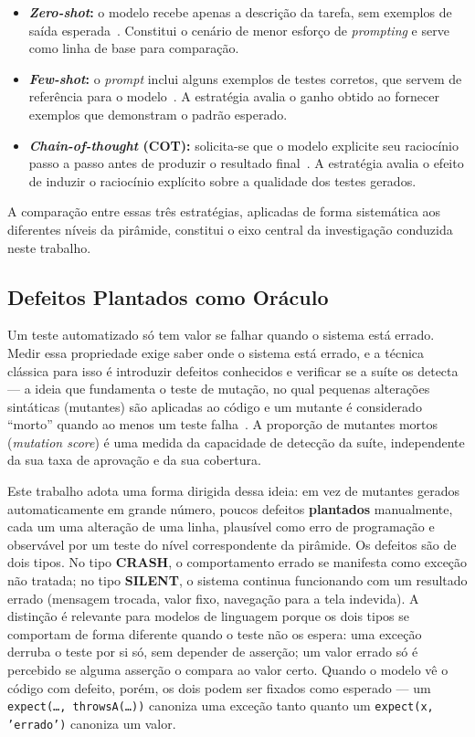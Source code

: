 \documentclass[12pt]{article}
\begin{document}
\begin{itemize}
  \item \textbf{\textit{Zero-shot}:} o modelo recebe apenas a descrição da
  tarefa, sem exemplos de saída esperada~\cite{kojima2022}. Constitui o
  cenário de menor esforço de \textit{prompting} e serve como linha de base para
  comparação.

  \item \textbf{\textit{Few-shot}:} o \textit{prompt} inclui alguns exemplos
  de testes corretos, que servem de referência para o
  modelo~\cite{brown2020}. A estratégia avalia o ganho obtido ao fornecer
  exemplos que demonstram o padrão esperado.

  \item \textbf{\textit{Chain-of-thought} (COT):} solicita-se que o modelo
  explicite seu raciocínio passo a passo antes de produzir o resultado
  final~\cite{wei2022}. A estratégia avalia o efeito de induzir o
  raciocínio explícito sobre a qualidade dos testes gerados.
\end{itemize}

A comparação entre essas três estratégias, aplicadas de forma sistemática aos
diferentes níveis da pirâmide, constitui o eixo central da investigação
conduzida neste trabalho.

\subsection{Defeitos Plantados como Oráculo}
\label{subsec:oraculo}

Um teste automatizado só tem valor se falhar quando o sistema está errado.
Medir essa propriedade exige saber onde o sistema está errado, e a técnica
clássica para isso é introduzir defeitos conhecidos e verificar se a suíte
os detecta --- a ideia que fundamenta o teste de mutação, no qual pequenas
alterações sintáticas (mutantes) são aplicadas ao código e um mutante é
considerado ``morto'' quando ao menos um teste falha~\cite{jia2011mutation}.
A proporção de mutantes mortos (\textit{mutation score}) é uma medida da
capacidade de detecção da suíte, independente da sua taxa de aprovação e da
sua cobertura.

Este trabalho adota uma forma dirigida dessa ideia: em vez de mutantes
gerados automaticamente em grande número, poucos defeitos
\textbf{plantados} manualmente, cada um uma alteração de uma linha, plausível
como erro de programação e observável por um teste do nível correspondente da
pirâmide. Os defeitos são de dois tipos. No tipo \textbf{CRASH}, o
comportamento errado se manifesta como exceção não tratada; no tipo
\textbf{SILENT}, o sistema continua funcionando com um resultado errado
(mensagem trocada, valor fixo, navegação para a tela indevida). A
distinção é relevante para modelos de linguagem porque os dois tipos se
comportam de forma diferente quando o teste não os espera: uma exceção
derruba o teste por si só, sem depender de asserção; um valor errado só é
percebido se alguma asserção o compara ao valor certo. Quando o modelo vê o
código com defeito, porém, os dois podem ser fixados como esperado --- um
\texttt{expect(\ldots, throwsA(\ldots))} canoniza uma exceção tanto quanto
um \texttt{expect(x, 'errado')} canoniza um valor.
\end{document}

